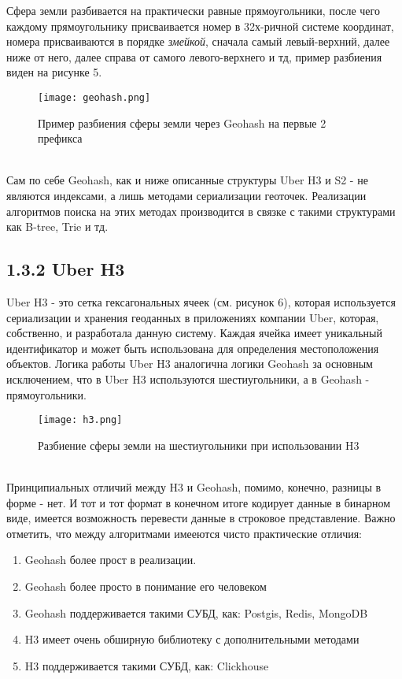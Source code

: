 Сфера земли разбивается на практически равные прямоугольники, после чего каждому прямоугольнику присваивается номер в 32х-ричной системе координат, номера присваиваются в порядке \textit{змейкой}, сначала самый левый-верхний, далее ниже от него, далее справа от самого левого-верхнего и тд, пример разбиения виден на рисунке 5.
  \\
\begin{figure}[h]
    \centering
    \texttt{[image: geohash.png]}
    \caption{Пример разбиения сферы земли через Geohash на первые 2 префикса}
\end{figure}
  \\
Сам по себе Geohash, как и ниже описанные структуры Uber H3 и S2 - не являются индексами\cite{balkicGeohash}, а лишь методами сериализации геоточек. Реализации алгоритмов поиска на этих методах производится в связке с такими структурами как B-tree, Trie и тд. 

\subsection{1.3.2 Uber H3}
Uber H3 - это сетка гексагональных ячеек (см. рисунок 6), которая используется сериализации и хранения геоданных в приложениях компании Uber, которая, собственно, и разработала данную систему. Каждая ячейка имеет уникальный идентификатор и может быть использована для определения местоположения объектов. Логика работы Uber H3 аналогична логики Geohash за основным исключением, что в Uber H3 используются шестиугольники, а в Geohash - прямоугольники. 
  \\
\begin{figure}[h]
    \centering
    \texttt{[image: h3.png]}
    \caption{Разбиение сферы земли на шестиугольники при использовании H3}
\end{figure}
  \\
Принципиальных отличий между H3 и Geohash\cite{bohuiGeohashH2S2}, помимо, конечно, разницы в форме - нет. И тот и тот формат в конечном итоге кодирует данные в бинарном виде, имеется возможность перевести данные в строковое представление.  
Важно отметить, что между алгоритмами имееются чисто практические отличия:
\begin{enumerate}
    \item Geohash более прост в реализации. 
    \item Geohash более просто в понимание его человеком
    \item Geohash поддерживается такими СУБД, как: Postgis, Redis, MongoDB\cite{membreyMongodb}
    \item H3 имеет очень обширную библиотеку с дополнительными методами
    \item H3 поддерживается такими СУБД, как: Clickhouse
\end{enumerate}

